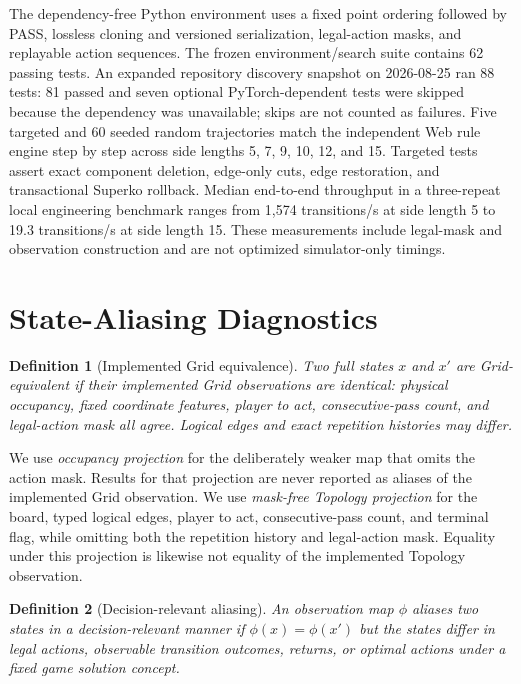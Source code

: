 \documentclass[10pt,letterpaper]{article}
\newtheorem{definition}{Definition}
\begin{document}
The dependency-free Python environment uses a fixed point ordering followed by
PASS, lossless cloning and versioned serialization, legal-action masks, and
replayable action sequences. The frozen environment/search suite contains 62
passing tests. An expanded repository discovery snapshot on 2026-08-25 ran 88
tests: 81 passed and seven optional PyTorch-dependent tests were skipped because
the dependency was unavailable; skips are not counted as failures.
Five targeted and 60 seeded random trajectories match the independent Web rule
engine step by step across side lengths 5, 7, 9, 10, 12, and 15. Targeted tests
assert exact component deletion, edge-only cuts, edge restoration, and
transactional Superko rollback. Median end-to-end throughput in a three-repeat
local engineering benchmark ranges from 1,574 transitions/s at side length 5
to 19.3 transitions/s at side length 15. These measurements include legal-mask
and observation construction and are not optimized simulator-only timings.

\section{State-Aliasing Diagnostics}
\label{sec:aliasing}

\begin{definition}[Implemented Grid equivalence]
Two full states $x$ and $x'$ are Grid-equivalent if their implemented Grid
observations are identical: physical occupancy, fixed coordinate features,
player to act, consecutive-pass count, and legal-action mask all agree.
Logical edges and exact repetition histories may differ.
\end{definition}

We use \emph{occupancy projection} for the deliberately weaker map that omits
the action mask. Results for that projection are never reported as aliases of
the implemented Grid observation.
We use \emph{mask-free Topology projection} for the board, typed logical edges,
player to act, consecutive-pass count, and terminal flag, while omitting both
the repetition history and legal-action mask. Equality under this projection
is likewise not equality of the implemented Topology observation.

\begin{definition}[Decision-relevant aliasing]
An observation map $\phi$ aliases two states in a decision-relevant manner if
$\phi(x)=\phi(x')$ but the states differ in legal actions, observable transition
outcomes, returns, or optimal actions under a fixed game solution concept.
\end{definition}
\end{document}
